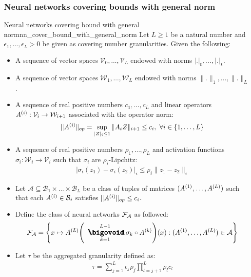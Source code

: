 \subsubsection{Neural networks covering bounds with general norm}
\begin{theorem}{Neural networks covering bound with general norm}{nn_cover_bound_with_general_norm}
    Let $L \ge 1$ be a natural number and $\epsilon_1, \dots, \epsilon_L > 0$ be given as covering number granularities. Given the following:
    \begin{itemize}
        \item A sequence of vector spaces $\mathcal{V}_0, \dots, \mathcal{V}_L$ endowed with norms $|.|_0, \dots, |.|_L$.
        \item A sequence of vector spaces $\mathcal{W}_1, \dots, \mathcal{W}_L$ endowed with norms $\|.\|_1, \dots, \|.\|_L$.
        \item A sequence of real positive numbers $c_1, \dots, c_L$ and linear operators $A^{(i)} : \mathcal{V}_i \to \mathcal{W}_{i+1}$ associated with the operator norm:
        \begin{align*}
            \|A^{(i)}\|_{op} = \sup_{|Z|_i \le 1} \|A_iZ\|_{i+1} \le c_i, \ \forall i \in \{1, \dots, L\}
        \end{align*}

        \item A sequence of real positive numbers $\rho_1, \dots, \rho_L$ and activation functions $\sigma_i:\mathcal{W}_i \to \mathcal{V}_i$ such that $\sigma_i$ are $\rho_i$-Lipchitz:
        \begin{align*}
            |\sigma_i(z_1) - \sigma_i(z_2)|_i \le \rho_i\|z_1 - z_2\|_i
        \end{align*}

        \item Let $\mathcal{A}\subseteq \mathcal{B}_1\times\dots\times\mathcal{B}_L$ be a class of tuples of matrices $(A^{(1)}, \dots, A^{(L)})$ such that each $A^{(i)} \in \mathcal{B}_i$ satisfies $\|A^{(i)}\|_{op} \le c_i$.

        \item Define the class of neural networks $\mathcal{F}_\mathcal{A}$ as followed:
        \begin{align*}
            \F_\mathcal{A} = \biggCurl{
                x\mapsto \A{L}\biggRound{
                    \bigO_{k=1}^{L-1}\sigma_k \circ \A{k}
                }(x) : (\A{1}, \dots, \A{L}) \in \mathcal{A}
            }
        \end{align*}
        
        \item Let $\tau$ be the aggregated granularity defined as:
        \begin{align*}
            \tau = \sum_{j=1}^L \epsilon_j \rho_j \prod_{l=j+1}^L \rho_lc_l
        \end{align*}
    \end{itemize}
\end{theorem}

